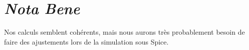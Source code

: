 \documentclass[11pt;a4paper]{report}
\begin{document}
%
%  
%  
%    
%    
%    
%  
%  
%  
%  
%  

   \section{\textit{Nota Bene}}
    Nos calculs semblent cohérents, mais nous aurons très probablement besoin de faire des ajustements lors de la simulation sous Spice.
\end{document}
